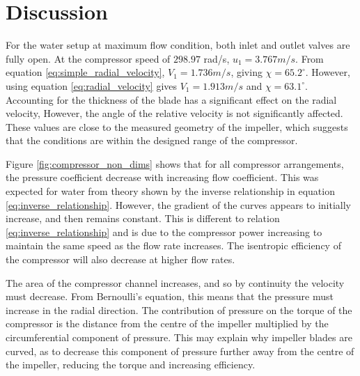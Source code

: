 \documentclass{article}
\begin{document}


\section{Discussion}

For the water setup at maximum flow condition, both inlet and outlet valves are fully open.
At the compressor speed of $298.97$ rad/s, $u_1 = 3.767 m/s$.
From equation \ref{eq:simple_radial_velocity}, $V_1 = 1.736 m/s$, giving $\chi = 65.2^\circ$.
However, using equation \ref{eq:radial_velocity} gives $V_1 = 1.913 m/s$ and $\chi = 63.1^\circ$.
Accounting for the thickness of the blade has a significant effect on the radial velocity,
However, the angle of the relative velocity is not significantly affected.
These values are close to the measured geometry of the impeller, which suggests
that the conditions are within the designed range of the compressor.

Figure \ref{fig:compressor_non_dims} shows that for all compressor arrangements, the pressure coefficient decrease with increasing flow coefficient.
This was expected for water from theory shown by the inverse relationship in equation \ref{eq:inverse_relationship}.
However, the gradient of the curves appears to initially increase, and then remains constant.
This is different to relation \ref{eq:inverse_relationship} and is due to the compressor power increasing to maintain the same speed as the flow rate increases.
The isentropic efficiency of the compressor will also decrease at higher flow rates.

The area of the compressor channel increases, and so by continuity the velocity must decrease.
From Bernoulli's equation, this means that the pressure must increase in the radial direction.
The contribution of pressure on the torque of the compressor is the distance from the centre of the impeller multiplied by the circumferential component of pressure.
This may explain why impeller blades are curved, as to decrease this component of pressure further away from the centre of the impeller, reducing the torque and increasing efficiency.




\end{document}
